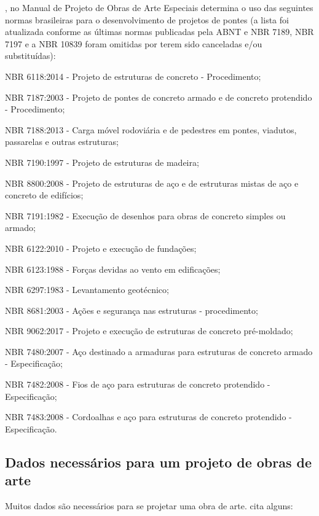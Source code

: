 , no Manual de Projeto de Obras de Arte Especiais determina o uso das seguintes normas brasileiras para o desenvolvimento de projetos de pontes (a lista foi atualizada conforme as últimas normas publicadas pela ABNT e NBR 7189, NBR 7197 e a NBR 10839 foram omitidas por terem sido canceladas e/ou substituídas):

\begin{alineas}[label=\textbullet]
  \item NBR 6118:2014 - Projeto de estruturas de concreto - Procedimento;
  \item NBR 7187:2003 - Projeto de pontes de concreto armado e de concreto protendido - Procedimento;
  \item NBR 7188:2013 - Carga móvel rodoviária e de pedestres em pontes, viadutos, passarelas e outras estruturas;
  \item NBR 7190:1997 - Projeto de estruturas de madeira;
  \item NBR 8800:2008 - Projeto de estruturas de aço e de estruturas mistas de aço e concreto de edifícios;
  \item NBR 7191:1982 - Execução de desenhos para obras de concreto simples ou armado;
  \item NBR 6122:2010 - Projeto e execução de fundações;
  \item NBR 6123:1988 - Forças devidas ao vento em edificações;
  \item NBR 6297:1983 - Levantamento geotécnico;
  \item NBR 8681:2003 - Ações e segurança nas estruturas - procedimento;
  \item NBR 9062:2017 - Projeto e execução de estruturas de concreto pré-moldado;
  \item NBR 7480:2007 - Aço destinado a armaduras para estruturas de concreto armado - Especificação;
  \item NBR 7482:2008 - Fios de aço para estruturas de concreto protendido - Especificação;
  \item NBR 7483:2008 - Cordoalhas e aço para estruturas de concreto protendido - Especificação.
\end{alineas}

\subsection{Dados necessários para um projeto de obras de arte}

Muitos dados são necessários para se projetar uma obra de arte.  cita alguns:

